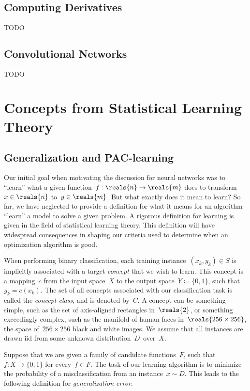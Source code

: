 \documentclass[11pt,a4paper]{article}
\numberwithin{equation}{section}
\begin{document}
\subsection{Computing Derivatives}
\label{sec:computing_derivatives}

TODO

\subsection{Convolutional Networks}

TODO

\section{Concepts from Statistical Learning Theory}

\subsection{Generalization and PAC-learning}

Our initial goal when motivating the discussion for neural networks was to
``learn'' what a given function~$f: \reals{n} \to \reals{m}$ does to
transform~$x \in \reals{n}$ to~$y \in \reals{m}$. But what exactly does it mean
to learn? So far, we have neglected to provide a definition for what it means
for an algorithm ``learn'' a model to solve a given problem. A rigorous
definition for learning is given in the field of statistical learning theory.
This definition will have widespread consequences in shaping our criteria used
to determine when an optimization algorithm is good.

When performing binary classification, each training instance~$(x_k, y_k) \in S$
is implicitly associated with a target \emph{concept} that we wish to learn.
This concept is a mapping~$c$ from the input space~$X$ to the output space~$Y
\coloneqq \{0, 1\}$, such that~$y_k = c(x_k)$. The set of all concepts
associated with our classification task is called the \emph{concept class}, and
is denoted by~$C$. A concept can be something simple, such as the set of
axis-aligned rectangles in~$\reals{2}$, or something exceedingly complex, such
as the manifold of human faces in~$\reals{256 \times 256}$, the space of~$256
\times 256$ black and white images. We assume that all instances are drawn iid
from some unknown distribution~$D$~over~$X$.

Suppose that we are given a family of candidate functions~$F$, such that~$f : X
\to \{0, 1\}$ for every~$f \in F$. The task of our learning algorithm is to
minimize the probability of a misclassification from an instance~$x \sim D$.
This leads to the following definition for \emph{generalization error}.
\end{document}
